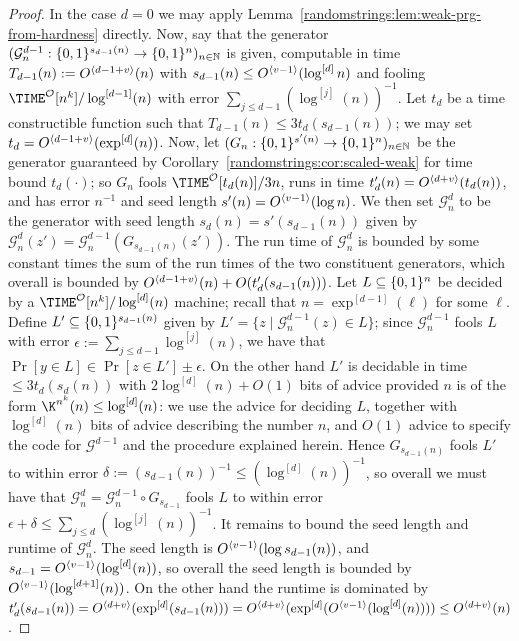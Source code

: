 \begin{proof}
In the case $d = 0$ we may apply Lemma~\ref{randomstrings:lem:weak-prg-from-hardness} directly. Now, say that the generator $(\mathcal{G}^{d-1}_n: \{0,1\}^{s_{d-1}(n)} \to \{0,1\}^n)_{n \in \mathbb{N}}$ is given, computable in time $T_{d-1}(n) := O^{\langle d-1+v \rangle}(n)$ with $s_{d-1}(n) \leq O^{\langle v-1 \rangle}(\log^{[d]}n)$ and fooling $\TIME^\mathcal{O}[n^k]/\log^{[d-1]}(n)$ with error $\sum_{j \leq d-1} (\log^{[j]}(n))^{-1}$. Let $t_{d}$ be a time constructible function such that $T_{d-1}(n) \leq 3t_{d}(s_{d-1}(n))$; we may set $t_{d} = O^{\langle d-1+v \rangle}(\exp^{[d]}(n))$. Now, let $(G_n: \{0,1\}^{s'(n)} \to \{0,1\}^n)_{n \in \mathbb{N}}$ be the generator guaranteed by Corollary~\ref{randomstrings:cor:scaled-weak} for time bound $t_d(\cdot)$; so $G_n$ fools $\TIME^\mathcal{O}[t_d(n)]/3n$, runs in time $t'_d(n) = O^{\langle d+v \rangle}(t_d(n))$, and has error $n^{-1}$ and seed length $s'(n) = O^{\langle v-1 \rangle}(\log n)$. We then set $\mathcal{G}^d_n$ to be the generator with seed length $s_d(n) = s'(s_{d-1}(n))$ given by $\mathcal{G}^d_n(z') = \mathcal{G}_n^{d-1}(G_{s_{d-1}(n)}(z'))$. The run time of $\mathcal{G}^{d}_n$ is bounded by some constant times the sum of the run times of the two constituent generators, which overall is bounded by $O^{\langle d-1+v \rangle}(n) + O(t'_d(s_{d-1}(n)))$. Let $L \subseteq \{0,1\}^n$ be decided by a $\TIME^\mathcal{O}[n^k]/\log^{[d]}(n)$ machine; recall that $n = \exp^{[d-1]}(\ell)$ for some $\ell$. Define $L' \subseteq \{0,1\}^{s_{d-1}(n)}$ given by $L' = \{z \mid \mathcal{G}^{d-1}_n(z) \in L\}$; since $\mathcal{G}^{d-1}_n$ fools $L$ with error $\epsilon := \sum_{j \leq d-1}\log^{[j]}(n)$, we have that $\Pr[y \in L] \in  \Pr[z \in L'] \pm \epsilon$. On the other hand $L'$ is decidable in time $\leq 3t_d(s_d(n))$ with $2 \log^{[d]}(n) + O(1)$ bits of advice provided $n$ is of the form $\K^{n^k}(n) \leq \log^{[d]}(n)$: we use the advice for deciding $L$, together with $\log^{[d]}(n)$ bits of advice describing the number $n$, and $O(1)$ advice to specify the code for $\mathcal{G}^{d-1}$ and the procedure explained herein. Hence $G_{s_{d-1}(n)}$ fools $L'$ to within error $\delta:= (s_{d-1}(n))^{-1} \leq (\log^{[d]}(n))^{-1}$, so overall we must have that $\mathcal{G}^d_n = \mathcal{G}^{d-1}_n \circ G_{s_{d-1}}$ fools $L$ to within error $\epsilon + \delta \leq \sum_{j \leq d} (\log^{[j]}(n))^{-1}$. It remains to bound the seed length and runtime of $\mathcal{G}^d_n$. The seed length is $O^{\langle v-1 \rangle}(\log s_{d-1}(n))$, and $s_{d-1} = O^{\langle v-1 \rangle}(\log^{[d]}(n))$, so overall the seed length is bounded by $O^{\langle v-1 \rangle}(\log^{[d+1]}(n))$. On the other hand the runtime is dominated by $t'_d(s_{d-1}(n)) = O^{\langle d+v \rangle}(\exp^{[d]}(s_{d-1}(n))) = O^{\langle d+v \rangle}(\exp^{[d]}(O^{\langle v-1 \rangle}(\log^{[d]}(n)))) \leq O^{\langle d+v \rangle}(n)$.


\end{proof}
